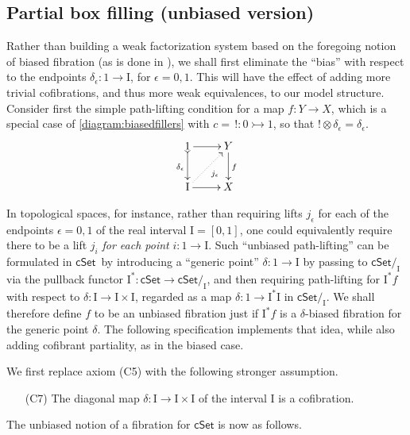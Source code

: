 \documentclass[11pt,reqno]{amsart}
\newcommand{\cSet}{\ensuremath{\mathsf{cSet}}}
\newcommand{\mono}{\ensuremath{\rightarrowtail}}
\newcommand{\ra}{\ensuremath{\rightarrow}}
\renewcommand{\to}{\ensuremath{\rightarrow}}
\newcommand{\I}{\ensuremath{\mathrm{I}}}
\theoremstyle{remark}
\theoremstyle{definition}
\begin{document}
\subsection*{Partial box filling (unbiased version)}\label{subsec:unbiasedfibration}

Rather than building a weak factorization system based on the foregoing notion of biased fibration (as is done in \cite{GS}), we shall first eliminate the ``bias'' with respect to the endpoints $\delta_\epsilon : 1 \ra \I$, for $\epsilon = 0,1$.  This will have the effect of adding more trivial cofibrations, and thus more weak equivalences, to our model structure. Consider first the simple path-lifting condition for a map $f : Y \to X$, which is a special case of \eqref{diagram:biasedfillers} with $c =\, ! : 0\mono 1$, so that $!\otimes\delta_\epsilon = \delta_\epsilon$.
\begin{equation*}
\xymatrix{
1 \ar@{>->}[d]_{\delta_\epsilon} \ar[r] & Y \ar[d]^f \\
\I \ar@{.>}[ru]_{j_\epsilon} \ar[r] & X
}
\end{equation*}

In topological spaces, for instance, rather than requiring lifts $j_\epsilon$ for each of the endpoints $\epsilon = 0,1$  of the real interval $\I = [0,1]$, one could equivalently require there to be a lift $j_i$ \emph{for each point} $i: 1\ra\I$. Such ``unbiased path-lifting'' can be formulated in \cSet\ by introducing a ``generic point'' $\delta : 1\ra \I$ by passing to $\cSet/_\I$ via the pullback functor $\I^* : \cSet\to \cSet/_\I$, and then requiring path-lifting for $\I^*f$ with respect to $\delta : \I \to \I\times \I$, regarded as a map $\delta : 1\to\I^*{\I}$ in $\cSet/_\I$. We shall therefore define $f$ to be an unbiased fibration just if $\I^*f$ is a $\delta$-biased fibration for the generic point $\delta$.  The following specification implements that  idea, while also adding cofibrant partiality, as in the biased case.  

We first replace axiom (C5) with the following stronger assumption.
%
\begin{enumerate}
\item[(C7)] The diagonal map $\delta : \I\ra\I\times\I$ of the interval $\I$  is a cofibration.  
\end{enumerate}

The unbiased notion of a fibration for $\cSet$ is now as follows.
\end{document}
